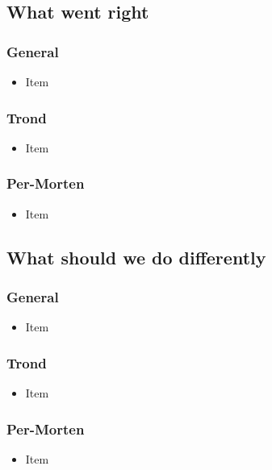\documentclass{article}
\begin{document}
\subsection*{What went right}
\subsubsection*{General}
\begin{itemize}
    \item
    Item
\end{itemize}

\subsubsection*{Trond}
\begin{itemize}
    \item 
    Item
\end{itemize}

\subsubsection*{Per-Morten}
\begin{itemize}
    \item
    Item
\end{itemize}


\subsection*{What should we do differently}
\subsubsection*{General}
\begin{itemize}
    \item
    Item
\end{itemize}

\subsubsection*{Trond}
\begin{itemize}
    \item 
    Item
\end{itemize}

\subsubsection*{Per-Morten}
\begin{itemize}
    \item
    Item
\end{itemize}
\end{document}
